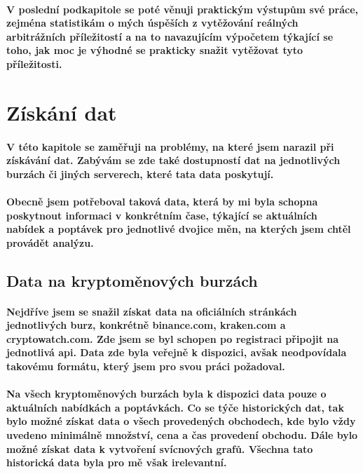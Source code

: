 \documentclass[thesis=B,czech]{FITthesis}[2019/03/21]
\begin{document}
\paragraph{
V poslední podkapitole se poté věnuji praktickým výstupům své práce, zejména statistikám o mých úspěších z vytěžování reálných arbitrážních příležitostí a na to navazujícím výpočetem týkající se toho, jak moc je výhodné se prakticky snažit vytěžovat tyto příležitosti.
}
\section{Získání dat}
\paragraph{
V této kapitole se zaměřuji na problémy, na které jsem narazil při získávání dat. Zabývám se zde také dostupností dat na jednotlivých burzách či jiných serverech, které tata data poskytují. 
}
\paragraph{
Obecně jsem potřeboval  taková data, která by mi byla schopna poskytnout informaci v konkrétním čase, týkající se aktuálních nabídek a poptávek pro jednotlivé dvojice měn, na kterých jsem chtěl provádět analýzu.
}
\subsection{Data na kryptoměnových burzách}
\paragraph{
Nejdříve jsem se snažil získat data na oficiálních stránkách jednotlivých burz, konkrétně binance.com, kraken.com a cryptowatch.com. Zde jsem se byl schopen po registraci připojit na jednotlivá api. Data zde byla veřejně k dispozici, avšak neodpovídala takovému formátu, který jsem pro svou práci požadoval. 
}
\paragraph{
Na všech kryptoměnových burzách byla k dispozici data pouze o aktuálních nabídkách a poptávkách. Co se týče historických dat, tak bylo možné získat data o všech provedených obchodech, kde bylo vždy uvedeno minimálně množství, cena a čas provedení obchodu. Dále bylo možné získat data k vytvoření svícnových grafů. Všechna tato historická data byla pro mě však irelevantní. 
}
\end{document}
